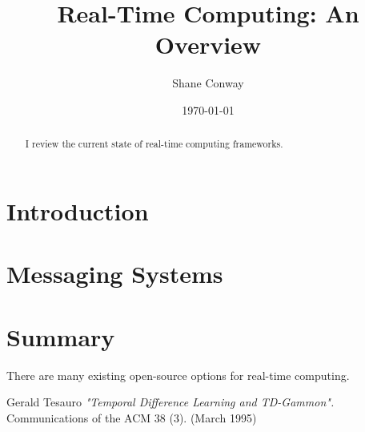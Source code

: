 \documentclass[11pt]{article} %
\title{Real-Time Computing: An Overview}
\author{Shane Conway}
\date{\today}\\ %
\begin{document}
\maketitle

\begin{abstract}
I review the current state of real-time computing frameworks.
\end{abstract}

\newpage




\tableofcontents

\listoffigures

\listoftables

\newpage

\section{Introduction}


\section{Messaging Systems}


\section{Summary}

There are many existing open-source options for real-time computing.

\begin{thebibliography}{1} %

 Gerald Tesauro {\sl "Temporal Difference
Learning and TD-Gammon".} Communications of the ACM 38 (3). (March 1995)

\end{thebibliography}

%
%
\end{document}
